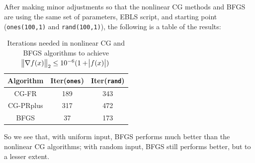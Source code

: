 \documentclass[11pt]{article}
\begin{document}
\subsection{}
After making minor adjustments so that the nonlinear CG methods and BFGS are using the same set of parameters, EBLS script, and starting point (\texttt{ones(100,1)} and \texttt{rand(100,1)}), the following is a table of the results:
\begin{table}[h]
	\centering
	\caption{Iterations needed in nonlinear CG and BFGS algorithms to achieve $\norm{\nabla f(x)}_2\leq 10^{-6}(1+\abs{f(x)})$}
	\begin{tabular}{|c c c|} 
	\hline 
	Algorithm & Iter(\texttt{ones}) & Iter(\texttt{rand}) \\
	\hline \hline
	CG-FR & 189 & 343\\
	\hline
	CG-PRplus & 317 & 472\\
	\hline
	BFGS & 37 & 173 \\
	\hline
	\end{tabular}
\end{table}
So we see that, with uniform input, BFGS performs much better than the nonlinear CG algorithms; with random input, BFGS still performs better, but to a lesser extent.
\end{document}
